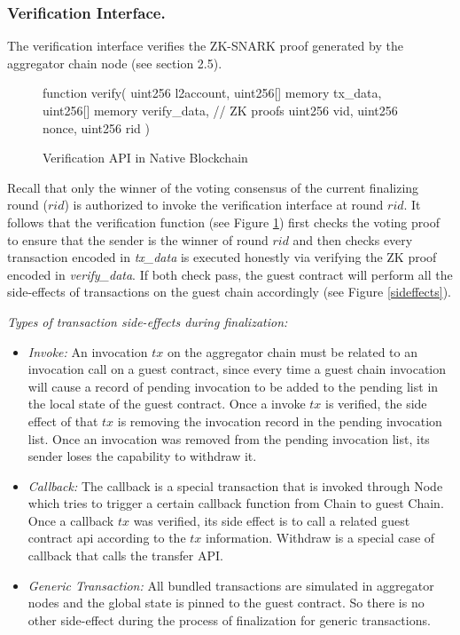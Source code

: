 \subsubsection*{Verification Interface.}
The verification interface verifies the ZK-SNARK proof generated by the aggregator chain node (see section 2.5).
\begin{figure}[!ht]
\begin{code}
function verify(
  uint256 l2account,
  uint256[] memory tx_data,
  uint256[] memory verify_data, // ZK proofs 
  uint256 vid,
  uint256 nonce,
  uint256 rid
)
\end{code}
\caption{Verification API in Native Blockchain}
\label{fig:verify-api}
\end{figure}

Recall that only the winner of the voting consensus of the current finalizing round ($rid$) is authorized to invoke the verification interface at round $rid$. It follows that the verification function (see Figure \ref{fig:verify-api}) first checks the voting proof to ensure that the sender is the winner of round $rid$ and then checks every transaction encoded in {\it tx\_data} is executed honestly via verifying the ZK proof encoded in {\it verify\_data}. If both check pass, the guest contract will perform all the side-effects of transactions on the guest chain accordingly (see Figure \ref{sideffects}).

\smallskip\noindent\emph{Types of transaction side-effects during finalization:}
\begin{itemize}[leftmargin=*]
\item \emph{Invoke:}
    An invocation $tx$ on the aggregator chain must be related to an invocation call on a guest contract, since every time a guest chain invocation will cause a record of pending invocation to be added to the pending list in the local state of the guest contract.
    Once a invoke $tx$ is verified, the side effect of that $tx$ is removing the invocation record in the pending invocation list.
    Once an invocation was removed from the pending invocation list, its sender loses the capability to withdraw it.

\item \emph{Callback:}
    The callback is a special transaction that is invoked through \dprotocol Node which tries to trigger a certain callback function from \dprotocol Chain to guest Chain.
    Once a callback $tx$ was verified, its side effect is to call a related guest contract api according to the $tx$ information.
    Withdraw is a special case of callback that calls the transfer API.

\item \emph{Generic Transaction:}
    All bundled transactions are simulated in aggregator nodes and the global state is pinned to the guest contract. So there is no other side-effect during the process of finalization for generic transactions.
\end{itemize}
